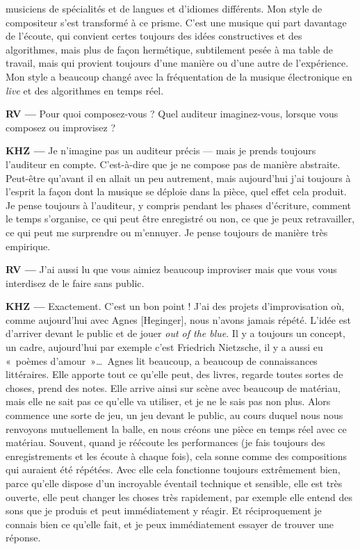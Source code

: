 \documentclass[a4paper,12pt]{article}
\newcommand{\guill}[1]{«~#1~»}
\begin{document}
musiciens de spécialités et de langues et d'idiomes différents. Mon style de compositeur s'est transformé à ce prisme. C'est une musique qui part davantage de l'écoute, qui convient certes toujours des idées constructives et des algorithmes, mais plus de façon hermétique, subtilement pesée à ma table de travail, mais qui provient toujours d'une manière ou d'une autre de l'expérience. Mon style a beaucoup changé avec la fréquentation de la musique électronique en \emph{live} et des algorithmes en temps réel.

\textbf{RV ---} Pour quoi composez-vous ? Quel auditeur imaginez-vous, lorsque vous composez ou improvisez ?

\textbf{KHZ ---} Je n'imagine pas un auditeur précis --- mais je prends toujours l'auditeur en compte. C'est-à-dire que je ne compose pas de manière abstraite. Peut-être qu'avant il en allait un peu autrement, mais aujourd'hui j'ai toujours à l'esprit la façon dont la musique se déploie dans la pièce, quel effet cela produit. Je pense toujours à l'auditeur, y compris pendant les phases d'écriture, comment le temps s'organise, ce qui peut être enregistré ou non, ce que je peux retravailler, ce qui peut me surprendre ou m'ennuyer. Je pense toujours de manière très empirique.

\textbf{RV ---} J'ai aussi lu que vous aimiez beaucoup improviser mais que vous vous interdisez de le faire sans public.

\textbf{KHZ ---} Exactement. C'est un bon point ! J'ai des projets d'improvisation où, comme aujourd'hui avec Agnes [Heginger], nous n'avons jamais répété. L'idée est d'arriver devant le public et de jouer \emph{out of the blue}. Il y a toujours un concept, un cadre, aujourd'hui par exemple c'est Friedrich Nietzsche, il y a aussi eu \guill{poèmes d'amour}\dots~Agnes lit beaucoup, a beaucoup de connaissances littéraires. Elle apporte tout ce qu'elle peut, des livres, regarde toutes sortes de choses, prend des notes. Elle arrive ainsi sur scène avec beaucoup de matériau, mais elle ne sait pas ce qu'elle va utiliser, et je ne le sais pas non plus. Alors commence une sorte de jeu, un jeu devant le public, au cours duquel nous nous renvoyons mutuellement la balle, en nous créons une pièce en temps réel avec ce matériau. Souvent, quand je réécoute les performances (je fais toujours des enregistrements et les écoute à chaque fois), cela sonne comme des compositions qui auraient été répétées. Avec elle cela fonctionne toujours extrêmement bien, parce qu'elle dispose d'un incroyable éventail technique et sensible, elle est très ouverte, elle peut changer les choses très rapidement, par exemple elle entend des sons que je produis et peut immédiatement y réagir. Et réciproquement je connais bien ce qu'elle fait, et je peux immédiatement essayer de trouver une réponse.
\end{document}
